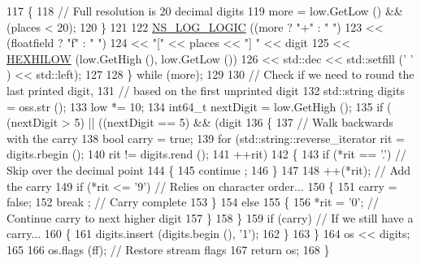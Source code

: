 \begin{DoxyCode}
117         \{
118           \textcolor{comment}{// Full resolution is 20 decimal digits}
119           more = low.GetLow () && (places < 20);
120         \}
121 
122       \hyperlink{group__logging_ga88acd260151caf2db9c0fc84997f45ce}{NS\_LOG\_LOGIC} ((more ? \textcolor{stringliteral}{"+"} : \textcolor{stringliteral}{" "})
123                     << (floatfield ? \textcolor{stringliteral}{"f"} : \textcolor{stringliteral}{" "})
124                     << \textcolor{stringliteral}{"["} << places << \textcolor{stringliteral}{"] "} << digit
125                     << \hyperlink{group__highprec_gab4ef18031edb07b2d7cb6197583f3c51}{HEXHILOW} (low.GetHigh (), low.GetLow ())
126                     << std::dec << std::setfill (\textcolor{charliteral}{' '} ) << std::left);
127 
128     \} \textcolor{keywordflow}{while} (more);
129 
130   \textcolor{comment}{// Check if we need to round the last printed digit,}
131   \textcolor{comment}{// based on the first unprinted digit}
132   std::string digits = oss.str ();
133   low *= 10;
134   int64\_t nextDigit = low.GetHigh ();
135   \textcolor{keywordflow}{if} ( (nextDigit > 5) || ((nextDigit == 5) && (digit %
136     \{
137       \textcolor{comment}{// Walk backwards with the carry}
138       \textcolor{keywordtype}{bool} carry = \textcolor{keyword}{true};
139       \textcolor{keywordflow}{for} (std::string::reverse\_iterator rit = digits.rbegin ();
140            rit != digits.rend ();
141            ++rit)
142         \{
143           \textcolor{keywordflow}{if} (*rit == \textcolor{charliteral}{'.'})  \textcolor{comment}{// Skip over the decimal point}
144             \{
145               continue ;
146             \}
147 
148           ++(*rit);         \textcolor{comment}{// Add the carry}
149           \textcolor{keywordflow}{if} (*rit <= \textcolor{charliteral}{'9'})  \textcolor{comment}{// Relies on character order...}
150             \{
151               carry = \textcolor{keyword}{false};
152               break ;       \textcolor{comment}{// Carry complete}
153             \}
154           \textcolor{keywordflow}{else}
155             \{
156               *rit = \textcolor{charliteral}{'0'};     \textcolor{comment}{// Continue carry to next higher digit}
157             \}
158         \}
159       \textcolor{keywordflow}{if} (carry)            \textcolor{comment}{// If we still have a carry...}
160         \{
161           digits.insert (digits.begin (), \textcolor{charliteral}{'1'});
162         \}
163     \}
164   os << digits;
165 
166   os.flags (ff);  \textcolor{comment}{// Restore stream flags}
167   \textcolor{keywordflow}{return} os;
168 \}
\end{DoxyCode}
